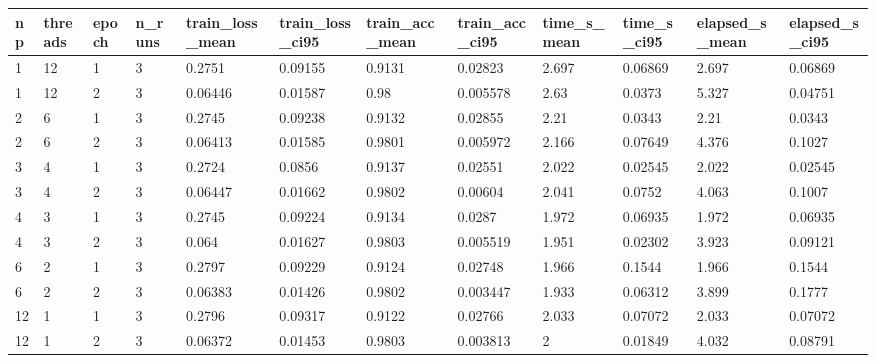 \begin{tabular}{llllllllllll}
\hline
np & threads & epoch & n\_runs & train\_loss\_mean & train\_loss\_ci95 & train\_acc\_mean & train\_acc\_ci95 & time\_s\_mean & time\_s\_ci95 & elapsed\_s\_mean & elapsed\_s\_ci95 \\
\hline
1 & 12 & 1 & 3 & 0.2751 & 0.09155 & 0.9131 & 0.02823 & 2.697 & 0.06869 & 2.697 & 0.06869 \\
1 & 12 & 2 & 3 & 0.06446 & 0.01587 & 0.98 & 0.005578 & 2.63 & 0.0373 & 5.327 & 0.04751 \\
2 & 6 & 1 & 3 & 0.2745 & 0.09238 & 0.9132 & 0.02855 & 2.21 & 0.0343 & 2.21 & 0.0343 \\
2 & 6 & 2 & 3 & 0.06413 & 0.01585 & 0.9801 & 0.005972 & 2.166 & 0.07649 & 4.376 & 0.1027 \\
3 & 4 & 1 & 3 & 0.2724 & 0.0856 & 0.9137 & 0.02551 & 2.022 & 0.02545 & 2.022 & 0.02545 \\
3 & 4 & 2 & 3 & 0.06447 & 0.01662 & 0.9802 & 0.00604 & 2.041 & 0.0752 & 4.063 & 0.1007 \\
4 & 3 & 1 & 3 & 0.2745 & 0.09224 & 0.9134 & 0.0287 & 1.972 & 0.06935 & 1.972 & 0.06935 \\
4 & 3 & 2 & 3 & 0.064 & 0.01627 & 0.9803 & 0.005519 & 1.951 & 0.02302 & 3.923 & 0.09121 \\
6 & 2 & 1 & 3 & 0.2797 & 0.09229 & 0.9124 & 0.02748 & 1.966 & 0.1544 & 1.966 & 0.1544 \\
6 & 2 & 2 & 3 & 0.06383 & 0.01426 & 0.9802 & 0.003447 & 1.933 & 0.06312 & 3.899 & 0.1777 \\
12 & 1 & 1 & 3 & 0.2796 & 0.09317 & 0.9122 & 0.02766 & 2.033 & 0.07072 & 2.033 & 0.07072 \\
12 & 1 & 2 & 3 & 0.06372 & 0.01453 & 0.9803 & 0.003813 & 2 & 0.01849 & 4.032 & 0.08791 \\
\hline
\end{tabular}
